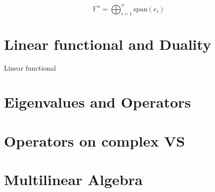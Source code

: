 \documentclass[lang=cn,11pt]{elegantbook}
\begin{document}
\begin{note}
    $$
    \mathbb{F}^n = \bigoplus_{i =1}^n \text{span}(e_i)
    $$
\end{note}


\chapter{Linear functional and Duality}
\begin{definition}{Linear functional}
\end{definition}


\chapter{Eigenvalues and Operators}


\chapter{Operators on complex VS}


\chapter{Multilinear Algebra}
\end{document}
